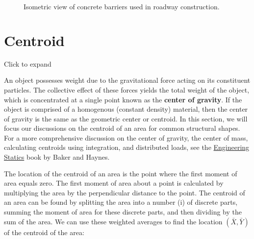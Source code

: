 \documentclass[
  letterpaper,
  DIV=11,
  numbers=noendperiod]{scrreprt}
\theoremstyle{definition}
\theoremstyle{remark}
\begin{document}
\begin{figure}


\caption{\label{fig-8.1}Isometric view of concrete barriers used in
roadway construction.}

\end{figure}%

\section{Centroid}\label{sec-8.1}

Click to expand

An object possesses weight due to the gravitational force acting on its
constituent particles. The collective effect of these forces yields the
total weight of the object, which is concentrated at a single point
known as the \textbf{center of gravity}. If the object is comprised of a
homogenous (constant density) material, then the center of gravity is
the same as the geometric center or centroid. In this section, we will
focus our discussions on the centroid of an area for common structural
shapes. For a more comprehensive discussion on the center of gravity,
the center of mass, calculating centroids using integration, and
distributed loads, see the
\href{https://engineeringstatics.org/Chapter_07-center-of-mass.html}{Engineering
Statics} book by Baker and Haynes.

The location of the centroid of an area is the point where the first
moment of area equals zero. The first moment of area about a point is
calculated by multiplying the area by the perpendicular distance to the
point. The centroid of an area can be found by splitting the area into a
number (i) of discrete parts, summing the moment of area for these
discrete parts, and then dividing by the sum of the area. We can use
these weighted averages to find the location \((\bar{X}, \bar{Y})\) of
the centroid of the area:
\end{document}
